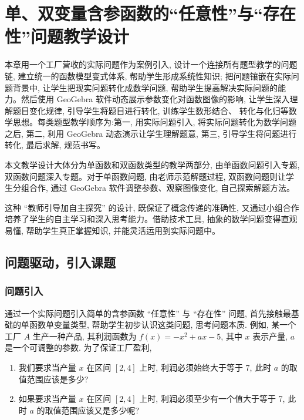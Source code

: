 
\chapter{单、双变量含参函数的“任意性”与“存在性”问题教学设计}
本章用一个工厂营收的实际问题作为案例引入, 设计一个连接所有题型教学的问题链, 建立统一的函数模型变式体系, 帮助学生形成系统性知识; 把问题镶嵌在实际问题背景中, 让学生把现实问题转化成数学问题, 帮助学生提高解决实际问题的能力。然后使用 GeoGebra 软件动态展示参数变化对函数图像的影响, 让学生深入理解题目变化规律, 引导学生将题目进行转化, 训练学生数形结合、 转化与化归等数学思想。每类题型教学顺序为:第一, 用实际问题引入, 将实际问题转化为数学问题之后, 第二, 利用 GeoGebra 动态演示让学生理解题意, 第三, 引导学生将问题进行转化, 最后求解, 规范书写。

本文教学设计大体分为单函数和双函数类型的教学两部分, 由单函数问题引入专题, 双函数问题深入专题。对于单函数问题, 由老师示范解题过程, 双函数问题则让学生分组合作, 通过 GeoGebra 软件调整参数、观察图像变化, 自己探索解题方法。

这种 “教师引导加自主探究” 的设计, 既保证了概念传递的准确性, 又通过小组合作培养了学生的自主学习和深入思考能力。借助技术工具, 抽象的数学问题变得直观易懂, 帮助学生真正掌握知识, 并能灵活运用到实际问题中。


\section{问题驱动，引入课题}
\subsection{问题引入}
通过一个实际问题引入简单的含参函数 “任意性” 与 “存在性” 问题, 首先接触最基础的单函数单变量类型, 帮助学生初步认识这类问题, 思考问题本质. 例如, 某一个工厂 \(A\) 生产一种产品, 其利润函数为 \(f(x)  =  - {x}^{2} + {ax} - 5\), 其中 \(x\) 表示产量, \(a\) 是一个可调整的参数. 为了保证工厂盈利, 

\begin{enumerate}[(1)]
  \item 我们要求当产量 \(x\) 在区间 \(\left\lbrack  {2, 4}\right\rbrack\) 上时, 利润必须始终大于等于 7, 此时 \(a\) 的取值范围应该是多少?

  \item 如果要求当产量 \(x\) 在区间 \(\left\lbrack  {2, 4}\right\rbrack\) 上时, 利润必须至少有一个值大于等于 7, 此时 \(a\) 的取值范围应该又是多少呢?
\end{enumerate}

